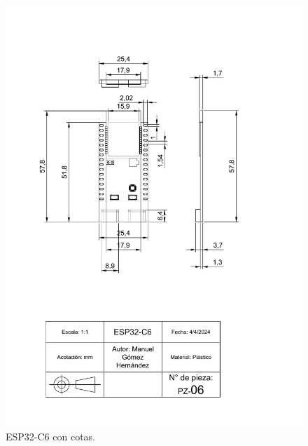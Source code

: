     
    \begin{figure}[H]
        \centering
        \includegraphics[scale=0.4]{15/img/eSP32Trazo.pdf}
        \caption{ESP32-C6 con cotas.}
        \label{fig:eSP332Trazo}
    \end{figure}
    
